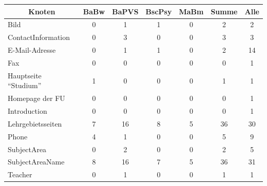     \begin{table}[htb]
        \centering
        \begin{tabular}{|l|c|c|c|c|c|c|}
            \hline
            \multicolumn{1}{|c|}{\textbf{Knoten}} & \textbf{BaBw} & \textbf{BaPVS} & \textbf{BscPsy} & \textbf{MaBm} & \textbf{Summe} & \textbf{Alle} \\ \hline
            Bild                                  & 0             & 1              & 1               & 0             & 2              & 2             \\ \hline
            ContactInformation                    & 0             & 3              & 0               & 0             & 3              & 3             \\ \hline
            E-Mail-Adresse                        & 0             & 1              & 1               & 0             & 2              & 14            \\ \hline
            Fax                                   & 0             & 0              & 0               & 0             & 0              & 1             \\ \hline
            Hauptseite "`Studium"'                & 1             & 0              & 0               & 0             & 1              & 1             \\ \hline
            Homepage der FU                       & 0             & 0              & 0               & 0             & 0              & 1             \\ \hline
            Introduction                          & 0             & 0              & 0               & 0             & 0              & 1             \\ \hline
            Lehrgebietsseiten                     & 7             & 16             & 8               & 5             & 36             & 30            \\ \hline
            Phone                                 & 4             & 1              & 0               & 0             & 5              & 9             \\ \hline
            SubjectArea                           & 0             & 2              & 0               & 0             & 2              & 5             \\ \hline
            SubjectAreaName                       & 8             & 16             & 7               & 5             & 36             & 31            \\ \hline
            Teacher                               & 0             & 1              & 0               & 0             & 1              & 1             \\ \hline

\end{tabular}
\end{table}
